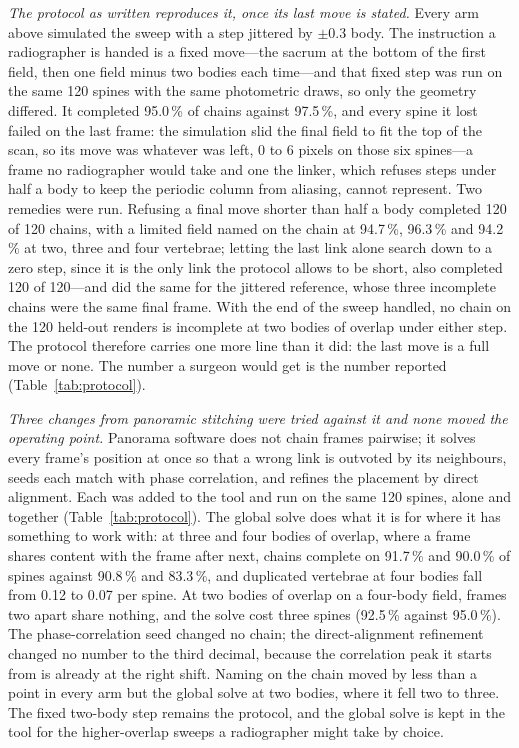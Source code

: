 \documentclass[11pt,letterpaper]{article}
\begin{document}
\emph{The protocol as written reproduces it, once its last move is stated.} Every arm above simulated the
sweep with a step jittered by $\pm$0.3 body. The instruction a radiographer is handed is a fixed move---the
sacrum at the bottom of the first field, then one field minus two bodies each time---and that fixed step
was run on the same 120 spines with the same photometric draws, so only the geometry differed. It completed
95.0\,\% of chains against 97.5\,\%, and every spine it lost failed on the last frame: the simulation slid the
final field to fit the top of the scan, so its move was whatever was left, 0 to 6 pixels on those six
spines---a frame no radiographer would take and one the linker, which refuses steps under half a body to
keep the periodic column from aliasing, cannot represent. Two remedies were run. Refusing a final move
shorter than half a body completed 120 of 120 chains, with a limited field named on the chain at 94.7\,\%,
96.3\,\% and 94.2\,\% at two, three and four vertebrae; letting the last link alone search down to a zero
step, since it is the only link the protocol allows to be short, also completed 120 of 120---and did the
same for the jittered reference, whose three incomplete chains were the same final frame. With the end of
the sweep handled, no chain on the 120 held-out renders is incomplete at two bodies of overlap under either
step. The protocol therefore carries one more line than it did: the last move is a full move or none. The
number a surgeon would get is the number reported (Table~\ref{tab:protocol}).

\emph{Three changes from panoramic stitching were tried against it and none moved the operating point.}
Panorama software does not chain frames pairwise; it solves every frame's position at once so that a
wrong link is outvoted by its neighbours, seeds each match with phase correlation, and refines the
placement by direct alignment. Each was added to the tool and run on the same 120 spines, alone and
together (Table~\ref{tab:protocol}). The global solve does what it is for where it has something to work with: at three and
four bodies of overlap, where a frame shares content with the frame after next, chains complete on
91.7\,\% and 90.0\,\% of spines against 90.8\,\% and 83.3\,\%, and duplicated vertebrae at four bodies fall
from 0.12 to 0.07 per spine. At two bodies of overlap on a four-body field, frames two apart share
nothing, and the solve cost three spines (92.5\,\% against 95.0\,\%). The phase-correlation seed changed no
chain; the direct-alignment refinement changed no number to the third decimal, because the correlation
peak it starts from is already at the right shift. Naming on the chain moved by less than a point in every
arm but the global solve at two bodies, where it fell two to three. The fixed two-body step remains the
protocol, and the global solve is kept in the tool for the higher-overlap sweeps a radiographer might take
by choice.
\end{document}
